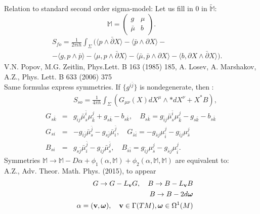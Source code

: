 \documentclass[9pt]{beamer}
\def\b{\bar}
\newcommand{\p}{\partial}
\def\b{\bar}
\begin{document}
\begin{frame}[t]
Relation to standard second order sigma-model: Let us fill in $0$ in $\tilde{\mathbb{M}}$:
\begin{equation*}\label{mmat}
\mathbb{M}=\begin{pmatrix} g & \mu \\ 
\bar{\mu} & b \end{pmatrix}.
\end{equation*}
\begin{eqnarray*}
&&S_{fo}=\frac{1}{2\pi i h}\int_\Sigma (\langle p\wedge\bar{\partial} X\rangle-
\langle \bar{p}\wedge{\partial} X\rangle-\nonumber\\
&& -\langle g, p\wedge \bar{p} \rangle-\langle \mu, p\wedge \b \p X\rangle -\langle \b \mu, \b p\wedge \p X\rangle-\langle b, \p X\wedge \b \p X\rangle).
\end{eqnarray*}
\hfill{\color{blue}\tiny V.N. Popov, M.G. Zeitlin, Phys.Lett. B 163 (1985) 185, A. Losev, A. Marshakov, A.Z., Phys. Lett. B 633 (2006) 375}\\
Same formulas express symmetries. If $\{g^{i\b j} \}$ is nondegenerate, then :
\begin{eqnarray*}
&&S_{so}=\frac{1}{4\pi h}\int_{\Sigma}(G_{\mu\nu}(X)dX^{\mu}\wedge *dX^{\nu}+X^*B),\\
G_{s\bar{k}}&=&g_{\bar{i}j}
\bar{\mu}^{\bar{i}}_s\mu^{j}_{\bar{k}}+g_{s\bar{k}}-
b_{s\bar{k}}, \quad
B_{s\bar{k}}=g_{\bar{i}j}\bar{\mu}^{\bar{i}}_s\mu^{j}_{\bar{k}}-g_{s\bar{k}}-
b_{s\bar{k}}\\
G_{si}&=&-g_{i\bar{j}}\bar{\mu}^{\bar{j}}_s-g_{s\bar{j}}\bar{\mu}^{\bar{j}}_i
, \quad
G_{\bar{s}\bar{i}}=-g_{\bar{s}j}\mu^{j}_{\bar{i}}-g_{\bar{i}j}\mu^{j}_{\bar{s}}
\nonumber\\
B_{si}&=&g_{s\bar{j}}\bar{\mu}^{\bar{j}}_i-g_{i\bar{j}}\bar{\mu}^{\bar{j}}_s,
\quad
B_{\bar{s}\bar{i}}=g_{\bar{i}j}\mu^{j}_{\bar{s}}-g_{\bar{s}j}\mu^{j}_{\bar{i}}.
\end{eqnarray*}
Symmetries $\mathbb{M}\to \mathbb{M}-D\alpha+ \phi_1(\alpha,{\mathbb{M}})+\phi_2(\alpha, {\mathbb{M}},{\mathbb{M}})$ are equivalent to:\\ 
\hfill{\color{blue}\tiny  A.Z., Adv. Theor. Math. Phys. (2015), to appear}
\begin{eqnarray*}
&& G\to G-L_{\bf v}G,\quad B\to B-L_{\bf v}B\\ 
&& B\to B-2d{\bf\boldsymbol \omega}\nonumber\\
&& \alpha=({\bf v}, {\boldsymbol \omega}), \quad {\bf v}\in \Gamma(TM), {\boldsymbol \omega}\in \Omega^{1}(M)
\end{eqnarray*}
\end{frame}
\end{document}
